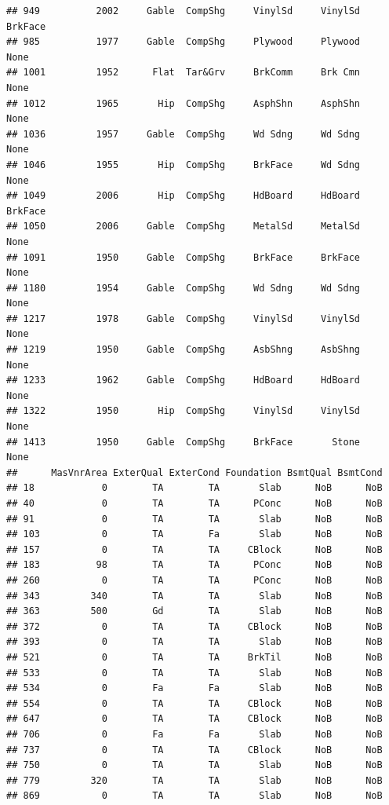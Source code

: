 \documentclass[]{article}
\begin{document}
\begin{verbatim}
## 949          2002     Gable  CompShg     VinylSd     VinylSd    BrkFace
## 985          1977     Gable  CompShg     Plywood     Plywood       None
## 1001         1952      Flat  Tar&Grv     BrkComm     Brk Cmn       None
## 1012         1965       Hip  CompShg     AsphShn     AsphShn       None
## 1036         1957     Gable  CompShg     Wd Sdng     Wd Sdng       None
## 1046         1955       Hip  CompShg     BrkFace     Wd Sdng       None
## 1049         2006       Hip  CompShg     HdBoard     HdBoard    BrkFace
## 1050         2006     Gable  CompShg     MetalSd     MetalSd       None
## 1091         1950     Gable  CompShg     BrkFace     BrkFace       None
## 1180         1954     Gable  CompShg     Wd Sdng     Wd Sdng       None
## 1217         1978     Gable  CompShg     VinylSd     VinylSd       None
## 1219         1950     Gable  CompShg     AsbShng     AsbShng       None
## 1233         1962     Gable  CompShg     HdBoard     HdBoard       None
## 1322         1950       Hip  CompShg     VinylSd     VinylSd       None
## 1413         1950     Gable  CompShg     BrkFace       Stone       None
##      MasVnrArea ExterQual ExterCond Foundation BsmtQual BsmtCond
## 18            0        TA        TA       Slab      NoB      NoB
## 40            0        TA        TA      PConc      NoB      NoB
## 91            0        TA        TA       Slab      NoB      NoB
## 103           0        TA        Fa       Slab      NoB      NoB
## 157           0        TA        TA     CBlock      NoB      NoB
## 183          98        TA        TA      PConc      NoB      NoB
## 260           0        TA        TA      PConc      NoB      NoB
## 343         340        TA        TA       Slab      NoB      NoB
## 363         500        Gd        TA       Slab      NoB      NoB
## 372           0        TA        TA     CBlock      NoB      NoB
## 393           0        TA        TA       Slab      NoB      NoB
## 521           0        TA        TA     BrkTil      NoB      NoB
## 533           0        TA        TA       Slab      NoB      NoB
## 534           0        Fa        Fa       Slab      NoB      NoB
## 554           0        TA        TA     CBlock      NoB      NoB
## 647           0        TA        TA     CBlock      NoB      NoB
## 706           0        Fa        Fa       Slab      NoB      NoB
## 737           0        TA        TA     CBlock      NoB      NoB
## 750           0        TA        TA       Slab      NoB      NoB
## 779         320        TA        TA       Slab      NoB      NoB
## 869           0        TA        TA       Slab      NoB      NoB

\end{verbatim}
\end{document}
